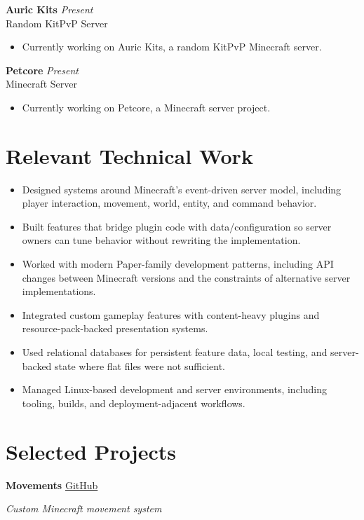 \documentclass[10pt,letterpaper]{article}
\newcommand{\role}[4]{
  \textbf{#1} \hfill \textit{#2}\\
  \textcolor{textgray}{#3} \hfill \textcolor{textgray}{#4}
  \vspace{2pt}
}
\begin{document}
\role{Auric Kits}{Present}{Random KitPvP Server}{}

\begin{itemize}
  \item Currently working on Auric Kits, a random KitPvP Minecraft server.
\end{itemize}

\role{Petcore}{Present}{Minecraft Server}{}

\begin{itemize}
  \item Currently working on Petcore, a Minecraft server project.
\end{itemize}

\section{Relevant Technical Work}

\begin{itemize}
  \item Designed systems around Minecraft's event-driven server model, including
        player interaction, movement, world, entity, and command behavior.
  \item Built features that bridge plugin code with data/configuration so server
        owners can tune behavior without rewriting the implementation.
  \item Worked with modern Paper-family development patterns, including API
        changes between Minecraft versions and the constraints of alternative
        server implementations.
  \item Integrated custom gameplay features with content-heavy plugins and
        resource-pack-backed presentation systems.
  \item Used relational databases for persistent feature data, local testing,
        and server-backed state where flat files were not sufficient.
  \item Managed Linux-based development and server environments, including
        tooling, builds, and deployment-adjacent workflows.
\end{itemize}

\section{Selected Projects}

\textbf{Movements} \hfill \href{https://github.com/Al3xSk1}{GitHub}

\textit{Custom Minecraft movement system}
\end{document}
